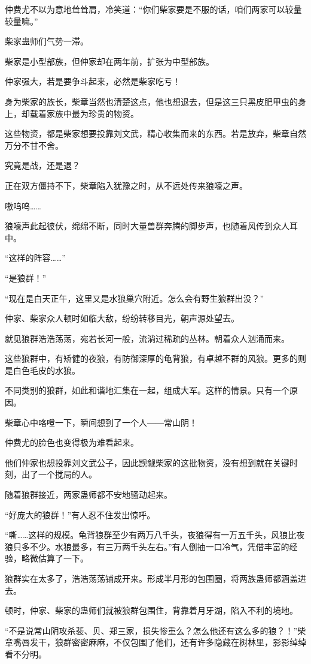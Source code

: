 \begin{this_body}
仲费尤不以为意地耸耸肩，冷笑道：“你们柴家要是不服的话，咱们两家可以较量较量嘛。”

柴家蛊师们气势一滞。

柴家是小型部族，但仲家却在两年前，扩张为中型部族。

仲家强大，若是要争斗起来，必然是柴家吃亏！

身为柴家的族长，柴章当然也清楚这点，他也想退去，但是这三只黑皮肥甲虫的身上，却载着家族中最为珍贵的物资。

这些物资，都是柴家想要投靠刘文武，精心收集而来的东西。若是放弃，柴章自然万分不甘不舍。

究竟是战，还是退？

正在双方僵持不下，柴章陷入犹豫之时，从不远处传来狼嚎之声。

嗷呜呜……

狼嚎声此起彼伏，绵绵不断，同时大量兽群奔腾的脚步声，也随着风传到众人耳中。

“这样的阵容……”

“是狼群！”

“现在是白天正午，这里又是水狼巢穴附近。怎么会有野生狼群出没？”

仲家、柴家众人顿时如临大敌，纷纷转移目光，朝声源处望去。

就见狼群浩浩荡荡，宛若长河一般，流淌过稀疏的丛林。朝着众人汹涌而来。

这些狼群中，有矫健的夜狼，有防御深厚的龟背狼，有卓越不群的风狼。更多的则是白色毛皮的水狼。

不同类别的狼群，如此和谐地汇集在一起，组成大军。这样的情景。只有一个原因。

柴章心中咯噔一下，瞬间想到了一个人――常山阴！

仲费尤的脸色也变得极为难看起来。

他们仲家也想投靠刘文武公子，因此觊觎柴家的这批物资，没有想到就在关键时刻，出了一个搅局的人。

随着狼群接近，两家蛊师都不安地骚动起来。

“好庞大的狼群！”有人忍不住发出惊呼。

“嘶……这样的规模。龟背狼群至少有两万八千头，夜狼得有一万五千头，风狼比夜狼只多不少。水狼最多，有三万两千头左右。”有人倒抽一口冷气，凭借丰富的经验，略微估算了一下。

狼群实在太多了，浩浩荡荡铺成开来。形成半月形的包围圈，将两族蛊师都涵盖进去。

顿时，仲家、柴家的蛊师们就被狼群包围住，背靠着月牙湖，陷入不利的境地。

“不是说常山阴攻杀裴、贝、郑三家，损失惨重么？怎么他还有这么多的狼？！”柴章嘴唇发干，狼群密密麻麻，不仅包围了他们，还有许多隐藏在树林里，影影绰绰看不分明。


\end{this_body}
